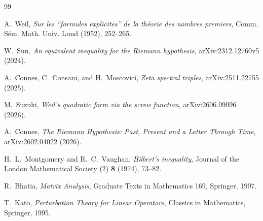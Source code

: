 \documentclass[11pt]{amsart}
\theoremstyle{definition}
\theoremstyle{remark}
\begin{document}
\begin{thebibliography}{99}

A.~Weil,
\emph{Sur les ``formules explicites'' de la théorie des nombres premiers},
Comm. Sém. Math. Univ. Lund (1952), 252--265.

W.~Sun,
\emph{An equivalent inequality for the Riemann hypothesis},
arXiv:2312.12760v5 (2024).

A.~Connes, C.~Consani, and H.~Moscovici,
\emph{Zeta spectral triples},
arXiv:2511.22755 (2025).

M.~Suzuki,
\emph{Weil's quadratic form via the screw function},
arXiv:2606.09096 (2026).

A.~Connes,
\emph{The Riemann Hypothesis: Past, Present and a Letter Through Time},
arXiv:2602.04022 (2026).

H.~L.~Montgomery and R.~C.~Vaughan,
\emph{Hilbert's inequality},
Journal of the London Mathematical Society (2) \textbf{8} (1974), 73--82.

R.~Bhatia,
\emph{Matrix Analysis},
Graduate Texts in Mathematics 169, Springer, 1997.

T.~Kato,
\emph{Perturbation Theory for Linear Operators},
Classics in Mathematics, Springer, 1995.

\end{thebibliography}
\end{document}
